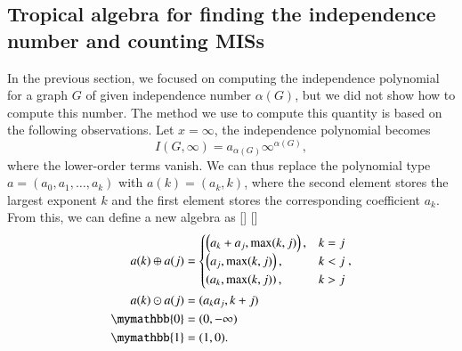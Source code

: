 \documentclass[onefignum, onetabnum]{siamart190516}
\newcommand{\<}{\langle}
\renewcommand{\>}{\rangle}
\newcommand{\red}[1]{[{\bf  \color{red}{ST: #1}}]}
\newcommand{\blue}[1]{[{\bf  \color{blue}{JG: #1}}]}
\begin{document}
\subsection{Tropical algebra for finding the independence number and counting MISs}
In the previous section, we focused on computing the independence polynomial for a graph $G$ of given independence number $\alpha(G)$, but we did not show how to compute this number.
The method we use to compute this quantity is based on the following observations. Let $x=\infty$, the independence polynomial becomes
\begin{equation}
I(G, \infty) = a_{\alpha(G)} \infty^{\alpha(G)},
\end{equation}
where the lower-order terms vanish. We can thus replace the polynomial type $a = (a_0, a_1, \ldots, a_k)$ with $a(k) = (a_{k}, k)$, where the second element stores the largest exponent $k$ and the first element stores the corresponding coefficient $a_{k}$.
From this, we can define a new algebra as \red{I've changed this, but I don't have strong feelings about this. We can certainly consider changing back.
I thought this would be more consistent with the earlier notations and show how it's stored in the program as well.}
\blue{I prefer the previous one, what about you @XG?}
\begin{equation}
\begin{split}
    a(k) \oplus a(j) &= \begin{cases}
        \left(a_k + a_j, \max(k,j) \right), & k = j \\
        \left(a_j, \max(k,j) \right), & k < j \\
        \left(a_k, \max(k,j) \right), & k > j
    \end{cases}, \\
    a(k) \odot a(j) &= (a_k a_j, k+j) \\
    \mymathbb{0} &= (0, -\infty)\\
    \mymathbb{1} &= (1, 0). \label{eq:countingtropical}
\end{split}
\end{equation}
\end{document}
